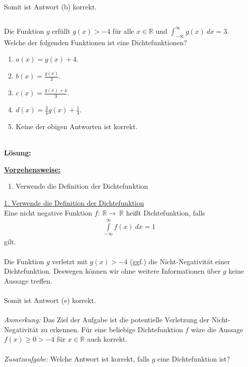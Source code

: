 Somit ist Antwort (b) korrekt.


\newpage

\newpage
\subsection*{}
Die Funktion $g$ erfüllt $g(x) > -4$ für alle $x \in \mathbb{R}$ und $\int_{- \infty}^\infty g(x) \ dx = 3$.\\
Welche der folgenden Funktionen ist eine Dichtefunktionen?
\renewcommand{\labelenumi}{(\alph{enumi})}
\begin{enumerate}
	\item 
	$ a(x) = g(x) + 4$.
	\item 
	$ b(x) = \frac{g(x)}{3}$.
	\item
	$ c(x) = \frac{g(x) + 4}{3} $.
	\item
	$ d(x) = \frac{3}{4} g(x) + \frac{1}{4} $.
	\item
	Keine der obigen Antworten ist korrekt.
\end{enumerate}
\ \\
\textbf{Lösung:}
\begin{mdframed}
	\underline{\textbf{Vorgehensweise:}}
	\renewcommand{\labelenumi}{\theenumi.}
	\begin{enumerate}
		\item Verwende die Definition der Dichtefunktion
	\end{enumerate}
\end{mdframed}

\underline{1. Verwende die Definition der Dichtefunktion}\\
Eine nicht negative Funktion $f : \ \mathbb{R} \to \ \mathbb{R}$ heißt Dichtefunktion, falls
\begin{align*}
	\int \limits_{- \infty}^\infty f(x) \ dx = 1
\end{align*}
gilt.\\
\\
Die Funktion $g$ verletzt mit $g(x) > - 4$ (ggf.) die Nicht-Negativität einer Dichtefunktion. Deswegen können wir ohne weitere Informationen über $g$ keine Aussage treffen.\\
\\
Somit ist Antwort (e) korrekt.\\
\\
\textit{Anmerkung:} Das Ziel der Aufgabe ist die potentielle Verletzung der Nicht-Negativität zu erkennen. Für eine beliebige Dichtefunktion $f$ wäre die Aussage $f(x) \geq 0 > -4 $ für $x \in \mathbb{R}$ auch korrekt.\\
\\
\textit{Zusatzaufgabe:} Welche Antwort ist korrekt, falls $g $ eine Dichtefunktion ist?



